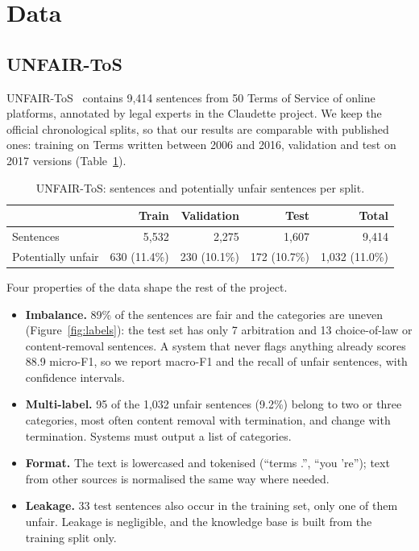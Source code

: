 \section{Data}
\label{sec:data}

\subsection{UNFAIR-ToS}

UNFAIR-ToS~\citep{chalkidis2022lexglue} contains 9,414 sentences from 50 Terms of Service of online platforms, annotated by legal experts in the Claudette project. We keep the official chronological splits, so that our results are comparable with published ones: training on Terms written between 2006 and 2016, validation and test on 2017 versions (Table~\ref{tab:unfairtos}).

\begin{table}[ht]
\centering\small
\caption{UNFAIR-ToS: sentences and potentially unfair sentences per split.}
\label{tab:unfairtos}
\begin{tabular}{@{}lrrrr@{}}
\toprule
& Train & Validation & Test & Total \\
\midrule
Sentences & 5,532 & 2,275 & 1,607 & 9,414 \\
Potentially unfair & 630 (11.4\%) & 230 (10.1\%) & 172 (10.7\%) & 1,032 (11.0\%) \\
\bottomrule
\end{tabular}
\end{table}

Four properties of the data shape the rest of the project.
\begin{itemize}
  \item \textbf{Imbalance.} 89\% of the sentences are fair and the categories are uneven (Figure~\ref{fig:labels}): the test set has only 7 arbitration and 13 choice-of-law or content-removal sentences. A system that never flags anything already scores 88.9 micro-F1, so we report macro-F1 and the recall of unfair sentences, with confidence intervals.
  \item \textbf{Multi-label.} 95 of the 1,032 unfair sentences (9.2\%) belong to two or three categories, most often content removal with termination, and change with termination. Systems must output a list of categories.
  \item \textbf{Format.} The text is lowercased and tokenised (``terms .'', ``you 're''); text from other sources is normalised the same way where needed.
  \item \textbf{Leakage.} 33 test sentences also occur in the training set, only one of them unfair. Leakage is negligible, and the knowledge base is built from the training split only.
\end{itemize}

